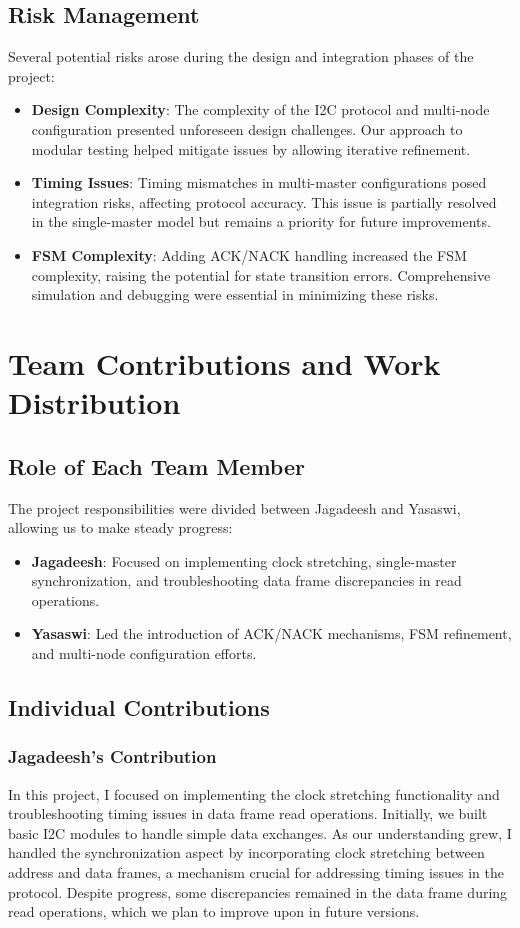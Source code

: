 \documentclass[a4paper,12pt]{report}
\begin{document}
\section{Risk Management}
Several potential risks arose during the design and integration phases of the project:
\begin{itemize}
    \item \textbf{Design Complexity}: The complexity of the I2C protocol and multi-node configuration presented unforeseen design challenges. Our approach to modular testing helped mitigate issues by allowing iterative refinement.
    \item \textbf{Timing Issues}: Timing mismatches in multi-master configurations posed integration risks, affecting protocol accuracy. This issue is partially resolved in the single-master model but remains a priority for future improvements.
    \item \textbf{FSM Complexity}: Adding ACK/NACK handling increased the FSM complexity, raising the potential for state transition errors. Comprehensive simulation and debugging were essential in minimizing these risks.
\end{itemize}
\newpage
\chapter{Team Contributions and Work Distribution}

\section{Role of Each Team Member}
The project responsibilities were divided between Jagadeesh and Yasaswi, allowing us to make steady progress:
\begin{itemize}
    \item \textbf{Jagadeesh}: Focused on implementing clock stretching, single-master synchronization, and troubleshooting data frame discrepancies in read operations.
    \item \textbf{Yasaswi}: Led the introduction of ACK/NACK mechanisms, FSM refinement, and multi-node configuration efforts.
\end{itemize}
\section{Individual Contributions}

\subsection*{Jagadeesh’s Contribution}
In this project, I focused on implementing the clock stretching functionality and troubleshooting timing issues in data frame read operations. Initially, we built basic I2C modules to handle simple data exchanges. As our understanding grew, I handled the synchronization aspect by incorporating clock stretching between address and data frames, a mechanism crucial for addressing timing issues in the protocol. Despite progress, some discrepancies remained in the data frame during read operations, which we plan to improve upon in future versions.
\end{document}
